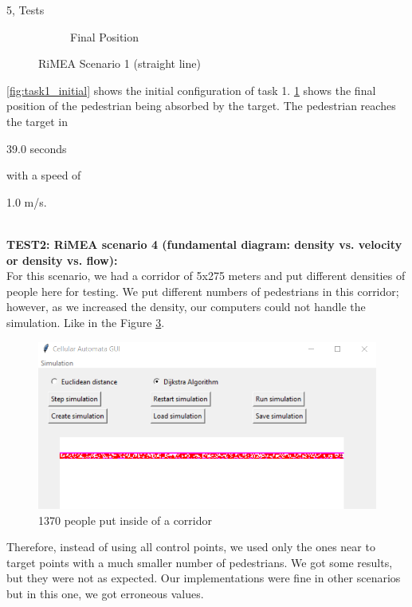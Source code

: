 \documentclass[10pt,a4paper]{article}
\begin{document}
\begin{task}{5, Tests}
\begin{figure}[H]
\begin{subfigure}[b]{0.3\textwidth}
         \caption{Final Position} 
         \label{fig:task1_final}
     \end{subfigure}
     \centering
    \caption{RiMEA Scenario 1 (straight line)} 
    \label{fig:task1}
\end{figure}

\ref{fig:task1_initial} shows the initial configuration of task 1. \ref{fig:task1_final} shows the final position of the pedestrian being absorbed by the target. The pedestrian reaches the target in \begin{tt}
    39.0 seconds
\end{tt} with a speed of \begin{tt}
    1.0 m/s.
\end{tt}\\

\textbf{TEST2: RiMEA scenario 4 (fundamental diagram: density vs. velocity or density vs. flow):}\\

For this scenario, we had a corridor of 5x275 meters and put different densities of people here for testing. We put different numbers of pedestrians in this corridor; however, as we increased the density, our computers could not handle the simulation. Like in the Figure \ref{fig:task5_scenario4}.\\

\begin{figure}[H]
    \centering
    \includegraphics{images/task5_scenario4.png}
    \caption{1370 people put inside of a corridor}
    \label{fig:task5_scenario4}
\end{figure}

Therefore, instead of using all control points, we used only the ones near to target points with a much smaller number of pedestrians. We got some results, but they were not as expected. Our implementations were fine in other scenarios but in this one, we got erroneous values. \\


\end{task}
\end{document}
